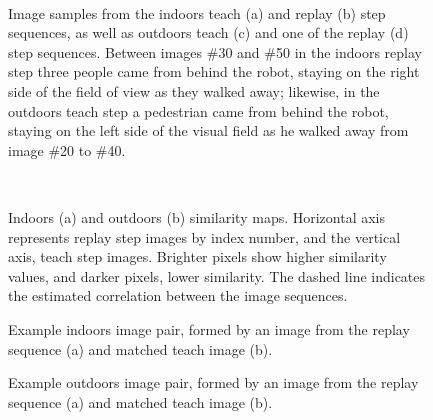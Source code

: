 \documentclass[twocolumn, 9pt,fleqn]{jsproceedings}
\begin{document}
\begin{figure}[b]
\centering
{}%
\hspace{0.1\columnwidth}%
\\
%
\hspace{0.1\columnwidth}%
\caption{Image samples from the indoors teach (a) and replay (b) step sequences, as well as outdoors teach (c) and one of the replay (d) step sequences. Between images \#30 and \#50 in the indoors replay step three people came from behind the robot, staying on the right side of the field of view as they walked away; likewise, in the outdoors teach step a pedestrian came from behind the robot, staying on the left side of the visual field as he walked away from image \#20 to \#40.}
\label{fig:environments}
\end{figure}

\begin{figure}[t]
\\
\caption{Indoors (a) and outdoors (b) similarity maps. Horizontal axis represents replay step images by index number, and the vertical axis, teach step images. Brighter pixels show higher similarity values, and darker pixels, lower similarity. The dashed line indicates the estimated correlation between the image sequences.}
\label{fig:similarity_maps}
\end{figure}

\begin{figure}[t]
%
\hspace{0.1\columnwidth}%
\caption{Example indoors image pair, formed by an image from the replay sequence (a) and matched teach image (b).}
\label{fig:indoors_pair}
\end{figure}

\begin{figure}[t]
%
\hspace{0.1\columnwidth}%
\caption{Example outdoors image pair, formed by an image from the replay sequence (a) and matched teach image (b).}
\label{fig:outdoors_pair}
\end{figure}
\end{document}
